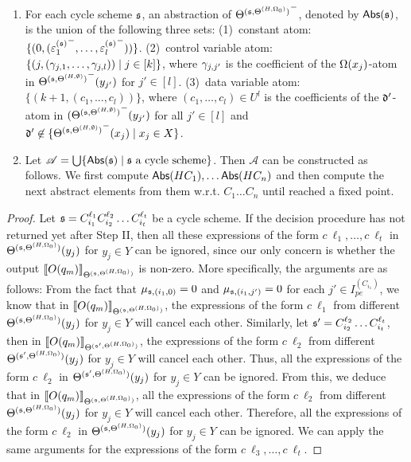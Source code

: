 \begin{appendix}
{\begin{enumerate}
\item For each cycle scheme ${\mathfrak{s} }$, an abstraction of ${\Theta^{({\mathfrak{s} }, \Theta^{(H,\Omega_0)})}}^-$, denoted by $\mathsf{Abs}({\mathfrak{s} })$,  is the union of the following three sets:
(1)~constant atom: $\{(0, ( {\varepsilon^{({\mathfrak{s} })}_{1}}^-,\dots, {\varepsilon^{({\mathfrak{s} })}_l}^-))\}$. (2)~control variable atom: $\{(j, (\gamma_{j,1},\dots, \gamma_{j,l})) \mid j \in [k]\}$, where $\gamma_{j, j'}$ is the coefficient of the $\Omega(x_j)$-atom in ${\Theta^{({\mathfrak{s} },\Theta^{(H,\emptyset)})}}^-(y_{j'})$ for $j'\in[l]$. (3)~data variable atom: $\{(k+1, (c_1,\dots,c_l))\}$, where $(c_1,\dots,c_l) \in U^l$ is the coefficients of the $\mathfrak{d}'$-atom in ${(\Theta^{({\mathfrak{s} },\Theta^{(H,\emptyset)})}}^-(y_{j'})$ for all $j' \in [l]$ and $\mathfrak{d}'\not\in \{{\Theta^{({\mathfrak{s} },\Theta^{(H,\emptyset)})}}^-(x_j)\mid x_j\in X\}$.
\item Let $\mathscr{A}=\bigcup \{\mathsf{Abs}({\mathfrak{s} }) \mid {\mathfrak{s} } \mbox{ a cycle scheme}\}$. Then $\mathscr{A}$ can be constructed as follows. We first compute $\mathsf{Abs}(HC_1), \ldots \mathsf{Abs}(HC_n)$ and then compute the next abstract elements from them w.r.t. $C_1\ldots C_n$ until reached a fixed point.
\end{enumerate}
}







\begin{proof}
Let ${\mathfrak{s} }=C_{i_1}^{\ell_1} C_{i_2}^{\ell_2} \dots C_{i_t}^{\ell_t}$ be a cycle scheme. If the decision procedure has not returned yet after Step II, then all these expressions of the form $c\ \ell_1,\dots, c\ \ell_t$ in $\Theta^{({\mathfrak{s} }, \Theta^{(H,\Omega_0)})}(y_j)$ for $y_j \in Y$ can be ignored, since our only concern is whether the output $\llbracket O(q_m)\rrbracket_{\Theta^{({\mathfrak{s} }, \Theta^{(H,\Omega_0)})}}$ is non-zero. More specifically, the arguments are as follows: From the fact that  $\mu_{{\mathfrak{s} },(i_1,0)}=0$ and $\mu_{{\mathfrak{s} },(i_1,j')}=0$ for each $j' \in I^{(C_{i_1})}_{pe}$, we know that in $\llbracket O(q_m)\rrbracket_{\Theta^{({\mathfrak{s} }, \Theta^{(H,\Omega_0)})}}$, the  expressions of the form $c\ \ell_1$ from different $\Theta^{({\mathfrak{s} }, \Theta^{(H,\Omega_0)})}(y_j)$ for $y_j \in Y$ will cancel each other. Similarly, let ${\mathfrak{s} }' = C_{i_2}^{\ell_2} \dots C_{i_t}^{\ell_t}$, then in $\llbracket O(q_m)\rrbracket_{\Theta^{({\mathfrak{s} }', \Theta^{(H,\Omega_0)})}}$, the  expressions of the form $c\ \ell_2$ from different $\Theta^{({\mathfrak{s} }', \Theta^{(H,\Omega_0)})}(y_j)$ for $y_j \in Y$ will cancel each other. Thus, all the expressions of the form $c\ \ell_2$ in $\Theta^{({\mathfrak{s} }', \Theta^{(H,\Omega_0)})}(y_j)$ for $y_j \in Y$ can be ignored. From this, we deduce that in $\llbracket O(q_m)\rrbracket_{\Theta^{({\mathfrak{s} }, \Theta^{(H,\Omega_0)})}}$, all the expressions of the form $c\ \ell_2$ from different $\Theta^{({\mathfrak{s} }, \Theta^{(H,\Omega_0)})}(y_j)$ for $y_j \in Y$ will cancel each other. Therefore, all the expressions of the form $c\ \ell_2$ in $\Theta^{({\mathfrak{s} }, \Theta^{(H,\Omega_0)})}(y_j)$ for $y_j \in Y$ can be ignored. We can apply the same arguments for the expressions of the form $c\ \ell_3,\dots,c\ \ell_t$.


\end{proof}
\end{appendix}
